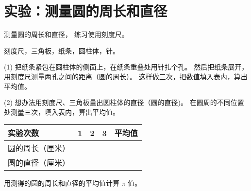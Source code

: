 \section{实验：测量圆的周长和直径}\label{sec:1-4}

 测量圆的周长和直径， 练习使用刻度尺。

 刻度尺，三角板，纸条，圆柱体，针。


(1) 把纸条紧包在圆柱体的侧面上，在纸条重叠处用针扎个孔。
然后把纸条展开，用刻度尺测量两孔之间的距离（圆的周长）。
这样做三次，把数值填入表内，算出平均值。

(2) 想办法用刻度尺、三角板量出圆柱体的直径（圆的直径)。
在圆周的不同位置处测量三次，填入表内，算出平均值。

\begin{table}[H]
    \centering
    \renewcommand\arraystretch{1.5}
    \begin{tabular}{|w{c}{8em}|*{3}{w{c}{4em}|}w{c}{5em}|}
        \hline
        实验次数        & 1 & 2 & 3 & 平均值  \\ \hline
        圆的周长（厘米） &   &   &   &  \\ \hline
        圆的直径（厘米） &   &   &   &  \\ \hline
    \end{tabular}
\end{table}

 用测得的圆的周长和直径的平均值计算 $\pi$ 值。

